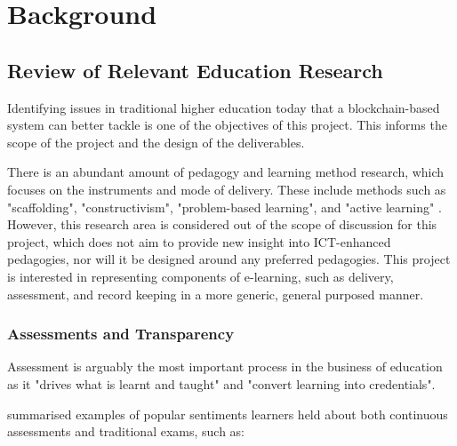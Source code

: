 
\chapter{Background}

    \graphicspath{{Chapter2/Figs/Raster/}{Chapter2/Figs/PDF/}{Chapter2/Figs/}}

\section{Review of Relevant Education Research}

Identifying issues in traditional higher education today that a blockchain-based system can better 
tackle is one of the objectives of this project. This informs the scope of the 
project and the design of the deliverables.

There is an abundant amount of pedagogy and learning method research, which focuses on the 
instruments and mode of delivery. These include methods such as "scaffolding", "constructivism", 
"problem-based learning", and "active learning" \citep{ali2005effective}. However, this 
research area is considered out of the scope of discussion for this project, which does not 
aim to provide new insight into ICT-enhanced pedagogies, nor will it be designed around any 
preferred pedagogies. This project is interested in representing components of e-learning, 
such as delivery, assessment, and record keeping in a more generic, general purposed manner.

\subsection{Assessments and Transparency}

Assessment is arguably the most important process in the business of education as it "drives what 
is learnt and taught" and "convert learning into credentials". \citep[p.160]{campbell2010digital}

\citet{brown1999assessment} summarised examples of popular sentiments learners held about both 
continuous assessments and traditional exams, such as:

